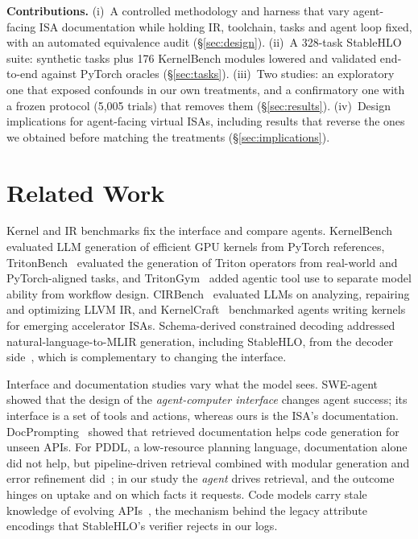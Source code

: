 \documentclass[conference]{IEEEtran}
\begin{document}
\textbf{Contributions.} (i)~A controlled methodology and harness that vary agent-facing ISA documentation while holding IR, toolchain, tasks and agent loop fixed, with an automated equivalence audit (\S\ref{sec:design}). (ii)~A 328-task StableHLO suite: synthetic tasks plus 176 KernelBench modules lowered and validated end-to-end against PyTorch oracles (\S\ref{sec:tasks}). (iii)~Two studies: an exploratory one that exposed confounds in our own treatments, and a confirmatory one with a frozen protocol (5{,}005 trials) that removes them (\S\ref{sec:results}). (iv)~Design implications for agent-facing virtual ISAs, including results that reverse the ones we obtained before matching the treatments (\S\ref{sec:implications}).



\section{Related Work}
Kernel and IR benchmarks fix the interface and compare agents. KernelBench~\cite{ouyang2025kernelbench} evaluated LLM generation of efficient GPU kernels from PyTorch references, TritonBench~\cite{li2025tritonbench} evaluated the generation of Triton operators from real-world and PyTorch-aligned tasks, and TritonGym~\cite{guan2026tritongym} added agentic tool use to separate model ability from workflow design. CIRBench~\cite{yang2026cirbench} evaluated LLMs on analyzing, repairing and optimizing LLVM IR, and KernelCraft~\cite{nie2026kernelcraft} benchmarked agents writing kernels for emerging accelerator ISAs. Schema-derived constrained decoding addressed natural-language-to-MLIR generation, including StableHLO, from the decoder side~\cite{rath2026mlirdecoding}, which is complementary to changing the interface.

Interface and documentation studies vary what the model sees. SWE-agent~\cite{yang2024sweagent} showed that the design of the \emph{agent-computer interface} changes agent success; its interface is a set of tools and actions, whereas ours is the ISA's documentation. DocPrompting~\cite{zhou2023docprompting} showed that retrieved documentation helps code generation for unseen APIs. For PDDL, a low-resource planning language, documentation alone did not help, but pipeline-driven retrieval combined with modular generation and error refinement did~\cite{wang2025pddldocs}; in our study the \emph{agent} drives retrieval, and the outcome hinges on uptake and on which facts it requests. Code models carry stale knowledge of evolving APIs~\cite{ashik2026evolvingapis}, the mechanism behind the legacy attribute encodings that StableHLO's verifier rejects in our logs.
\end{document}
